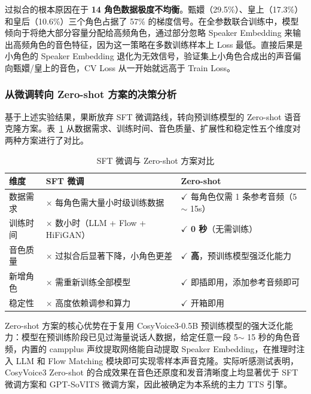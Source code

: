 \documentclass[12pt,a4paper]{article}
\begin{document}
过拟合的根本原因在于 \textbf{14 角色数据极度不均衡}。甄嬛（29.5\%）、皇上（17.3\%）和皇后（10.6\%）三个角色占据了 57\% 的梯度信号。在全参数联合训练中，模型倾向于将绝大部分容量分配给高频角色，通过部分忽略 Speaker Embedding 来输出高频角色的音色特征，因为这一策略在多数训练样本上 Loss 最低。直接后果是小角色的 Speaker Embedding 退化为无效信号，验证集上小角色合成出的声音偏向甄嬛/皇上的音色，CV Loss 从一开始就远高于 Train Loss。

\subsubsection{从微调转向 Zero-shot 方案的决策分析}

基于上述实验结果，果断放弃 SFT 微调路线，转向预训练模型的 Zero-shot 语音克隆方案。表~\ref{tab:sft-vs-zeroshot} 从数据需求、训练时间、音色质量、扩展性和稳定性五个维度对两种方案进行了对比。

\begin{table}[H]
\centering
\caption{SFT 微调与 Zero-shot 方案对比}
\label{tab:sft-vs-zeroshot}
\begin{tabular}{p{2.5cm}p{5.8cm}p{5.8cm}}
\toprule
\textbf{维度} & \textbf{SFT 微调} & \textbf{Zero-shot} \\
\midrule
数据需求   & $\times$ 每角色需大量小时级训练数据   & $\checkmark$ 每角色仅需 1 条参考音频（5$\sim$ 15s） \\
训练时间   & $\times$ 数小时（LLM + Flow + HiFiGAN） & $\checkmark$ \textbf{0 秒}（无需训练） \\
音色质量   & $\times$ 过拟合后显著下降，小角色更差   & $\checkmark$ \textbf{高}，预训练模型强泛化能力 \\
新增角色   & $\times$ 需重新训练全部模型           & $\checkmark$ 即插即用，添加参考音频即可    \\
稳定性     & $\times$ 高度依赖调参和算力           & $\checkmark$ 开箱即用                    \\
\bottomrule
\end{tabular}
\end{table}

Zero-shot 方案的核心优势在于复用 CosyVoice3-0.5B 预训练模型的强大泛化能力：模型在预训练阶段已见过海量说话人数据，给定任意一段 5$\sim$ 15 秒的角色音频，内置的 campplus 声纹提取网络能自动提取 Speaker Embedding，在推理时注入 LLM 和 Flow Matching 模块即可实现零样本声音克隆。实际听感测试表明，CosyVoice3 Zero-shot 的合成效果在音色还原度和发音清晰度上均显著优于 SFT 微调方案和 GPT-SoVITS 微调方案，因此被确定为本系统的主力 TTS 引擎。
\end{document}
